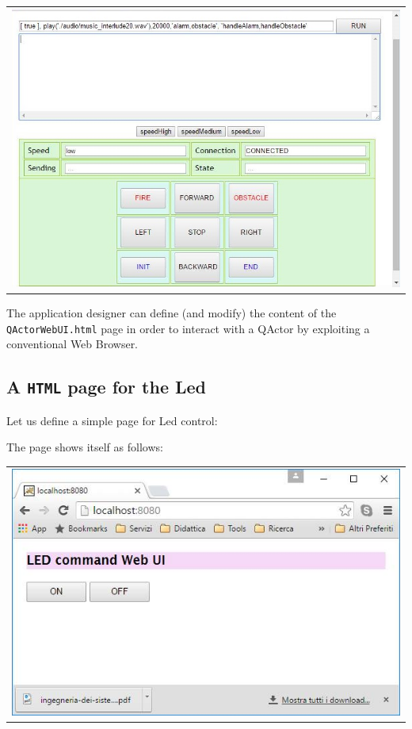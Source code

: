 \begin{center}
\begin{tabular}{ c }
     \includegraphics[scale = 0.60]{img/guiweb.jpg}\\
\end{tabular}{   }
\end{center}

The application designer can define (and modify) the content of the \texttt{QActorWebUI.html}  page in order to interact with a QActor by exploiting a conventional Web Browser.

\subsection{A \texttt{HTML} page for the Led}
Let us define a simple page for Led control:



The page shows itself as follows:
 
\begin{center}
\begin{tabular}{ c }
     \includegraphics[scale = 0.45]{./img/ledWebGui.jpg}\\
\end{tabular}{   }
\end{center}

